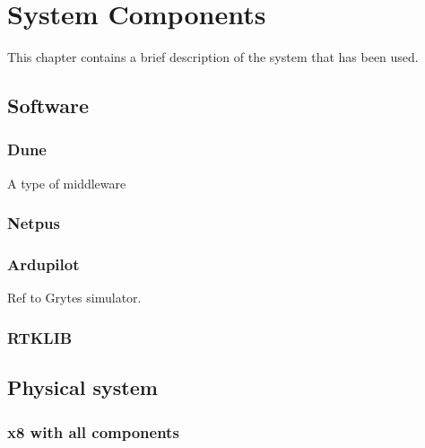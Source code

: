 
\chapter{System Components}
This chapter contains a brief description of the system that has been used.
\section{Software}
\subsection{Dune}
A type of middleware
\subsection{Netpus}
\subsection{Ardupilot}
Ref to Grytes simulator.
\subsection{RTKLIB}
\section{Physical system}
\subsection{x8 with all components}
\cleardoublepage